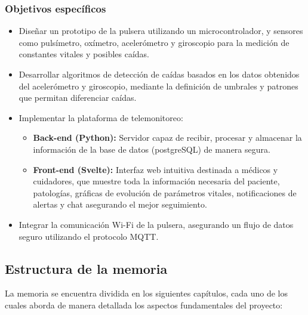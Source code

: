 \documentclass[12pt, a4paper]{article}
\begin{document}
	\subsubsection{Objetivos específicos}
	\begin{itemize}
		\item Diseñar un prototipo de la pulsera utilizando un microcontrolador, y sensores como pulsímetro, oxímetro, acelerómetro y giroscopio para la medición de constantes vitales y posibles caídas.
		
		\item Desarrollar algoritmos de detección de caídas basados en los datos obtenidos del acelerómetro y giroscopio, mediante la definición de umbrales y patrones que permitan diferenciar caídas.
		
		\item Implementar la plataforma de telemonitoreo:
		\begin{itemize}
			\item \textbf{Back-end (Python):} Servidor capaz de recibir, procesar y almacenar la información de la base de datos (postgreSQL) de manera segura.
			
			\item \textbf{Front-end (Svelte):} Interfaz web intuitiva destinada a médicos y cuidadores, que muestre toda la información necesaria del paciente, patologías, gráficas de evolución de parámetros vitales, notificaciones de alertas y  chat asegurando el mejor seguimiento.
		\end{itemize}
		
		\item Integrar la comunicación Wi-Fi de la pulsera, asegurando un flujo de datos seguro utilizando el protocolo MQTT.
		
		
	\end{itemize}

	
	\subsection{Estructura de la memoria}
	
	La memoria se encuentra dividida en los siguientes capítulos, cada uno de los cuales aborda de manera detallada los aspectos fundamentales del proyecto:
	
\end{document}
